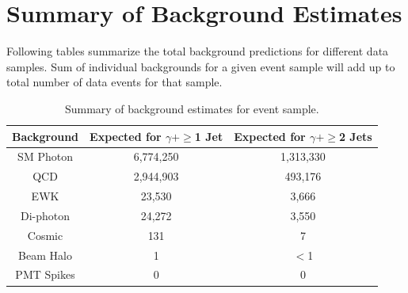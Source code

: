 \documentclass[11pt]{article}
\begin{document}


\section{Summary of Background Estimates}
Following tables summarize the total background predictions for different data samples. Sum of individual backgrounds for a given event sample will add up to total number of data events for that sample.

\begin{table}[h!]
\begin{center}
\begin{tabular} {|c|c|c|}
\hline
\bf{Background} & \bf{Expected for $\gamma+\geq$1 Jet} & \bf{Expected for $\gamma+\geq$2 Jets} \\
\hline
SM Photon  	& 6,774,250 & 1,313,330 \\
\hline
QCD		& 2,944,903 & 493,176 \\
\hline
EWK		& 23,530 & 3,666 \\
\hline
Di-photon 	& 24,272 & 3,550 \\
\hline
Cosmic 		& 131 & 7 \\
\hline
Beam Halo	& 1 & $<$1\\
\hline
PMT Spikes  	&  0 & 0 \\
\hline
\end{tabular}
\end{center}
\caption{Summary of background estimates for \phojets event sample.}
\label{tab:bgsummary}
\end{table}
\end{document}
